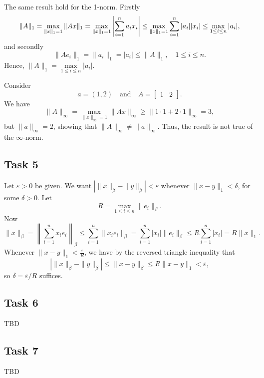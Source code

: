 \documentclass[a4paper,12pt]{article}
\begin{document}
The same result hold for the 1-norm.
Firstly
\[
  \|A\|_1
    = \max_{\|x\|_1 = 1} \|Ax\|_1\\
    = \max_{\|x\|_1 = 1} \left| \sum_{i=1}^n a_i x_i\right|
    \le \max_{\|x\|_1 = 1} \sum_{i=1}^n |a_i||x_i|
    \le \max_{1 \le i \le n} |a_i|,
\]
and secondly
\[ \|Ae_i\|_1 = \|a_i\|_1 = |a_i| \le \|A\|_1, \quad 1 \le i \le n. \]
Hence, $ \|A\|_1=\underset{1\le i \le n}{\max} |a_i|$.

Consider
\[
  a = (1, 2)
  \quad \text{and} \quad
  A =
    \begin{bmatrix}
      1 & 2
    \end{bmatrix}.
\]
We have
\[
  \|A\|_\infty
    = \max_{\|x\|_\infty = 1} \|Ax\|_\infty
    \ge \|1 \cdot 1 + 2 \cdot 1\|_\infty
    = 3,
\]
but \(\|a\|_\infty = 2\), showing that \(\|A\|_\infty \ne
\|a\|_\infty\).
Thus, the result is not true of the \(\infty\)-norm.


\subsection*{Task 5}

Let \(\varepsilon > 0\) be given.
We want \(\left|\|x\|_\beta - \|y\|_\beta\right| < \varepsilon\)
whenever \(\|x-y\|_1 < \delta\), for some \(\delta > 0\).
Let
\[ R = \max_{1 \le i \le n} \|e_i\|_\beta. \]
Now
\[
  \|x\|_\beta
    = \left\|\sum_{i=1}^n x_i e_i\right\|_\beta
    \le \sum_{i=1}^n \|x_i e_i\|_\beta
    = \sum_{i=1}^n |x_i| \|e_i\|_\beta
    \le R \sum_{i=1}^n |x_i|
    = R \|x\|_1.
\]
Whenever \(\|x-y\|_1 < \frac{\varepsilon}{R}\), we have by the reversed
triangle inequality that
\[
  \left|\|x\|_\beta - \|y\|_\beta\right|
    \le \|x - y\|_\beta
    \le R \|x - y\|_1
    < \varepsilon,
\]
so \(\delta = \varepsilon/R\) suffices.


\subsection*{Task 6}

TBD


\subsection*{Task 7}

TBD
\end{document}
